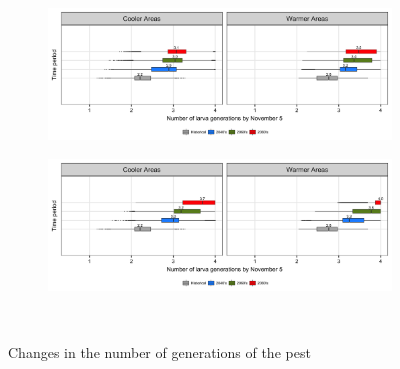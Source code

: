 \documentclass[12pt]{article}
\theoremstyle{plain}
\theoremstyle{definition}
\theoremstyle{definition}
\begin{document}
\begin{figure}[h!]
          \begin{subfigure}[b]{0.45\textwidth}
        \includegraphics[width=\textwidth]{figures/Larva_Gen_Nov_rcp45}
    \end{subfigure}
    \begin{subfigure}[b]{0.45\textwidth}
        \includegraphics[width=\textwidth]{figures/Larva_Gen_Nov_rcp85}
    \end{subfigure}\\
    \caption{Changes in the number of generations of the pest}\label{fig:CNGP}
\end{figure}

\pagebreak
\end{document}
